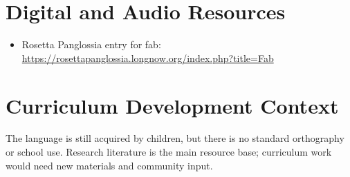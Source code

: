 \documentclass[12pt]{article}
\begin{document}
\section{Digital and Audio Resources}
\begin{itemize}
\item Rosetta Panglossia entry for fab: \url{https://rosettapanglossia.longnow.org/index.php?title=Fab}
\end{itemize}

\section{Curriculum Development Context}
The language is still acquired by children, but there is no standard orthography or school use. Research literature is the main resource base; curriculum work would need new materials and community input.
\end{document}
